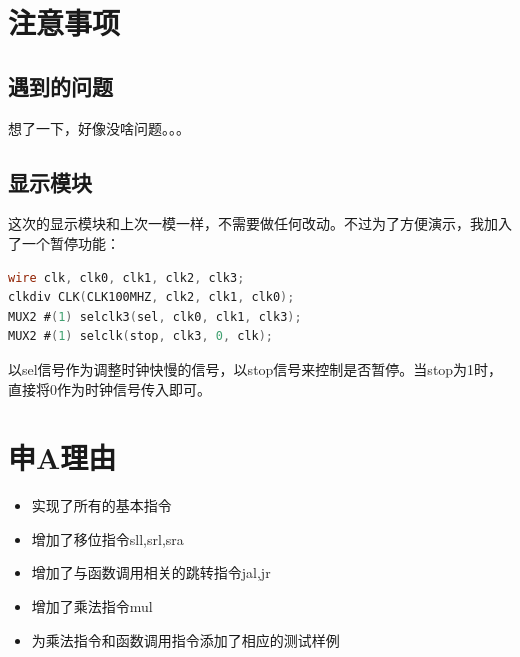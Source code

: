 \documentclass[12pt]{article} %
\begin{document}
\begin{sloppypar}
\section{注意事项}

\subsection{遇到的问题}

想了一下，好像没啥问题。。。

\subsection{显示模块}

这次的显示模块和上次一模一样，不需要做任何改动。不过为了方便演示，我加入了一个暂停功能：
\begin{lstlisting}[language=Verilog]
wire clk, clk0, clk1, clk2, clk3;
clkdiv CLK(CLK100MHZ, clk2, clk1, clk0);
MUX2 #(1) selclk3(sel, clk0, clk1, clk3);
MUX2 #(1) selclk(stop, clk3, 0, clk);
\end{lstlisting}
以sel信号作为调整时钟快慢的信号，以stop信号来控制是否暂停。当stop为1时，直接将0作为时钟信号传入即可。

\section{申A理由}

\begin{itemize}
\item 实现了所有的基本指令
\item 增加了移位指令sll,srl,sra
\item 增加了与函数调用相关的跳转指令jal,jr
\item 增加了乘法指令mul
\item 为乘法指令和函数调用指令添加了相应的测试样例
\end{itemize}

\end{sloppypar}
\end{document}
